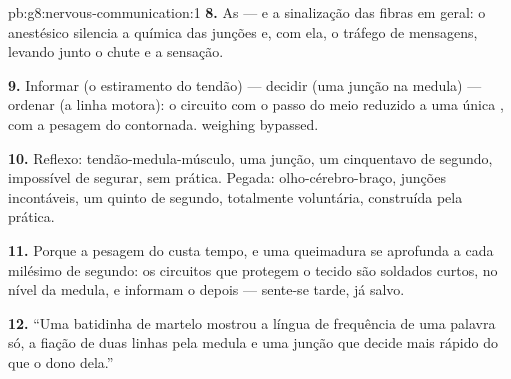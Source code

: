 \begin{solution}{pb:g8:nervous-communication:1}
\textbf{8.} As  --- e a sinalização das fibras em geral: o
anestésico silencia a química das junções e, com ela, o tráfego de
mensagens, levando junto o chute e a sensação.

\textbf{9.} Informar (o estiramento do tendão) --- decidir (uma junção
na medula) --- ordenar (a linha motora): o circuito com o passo do meio
reduzido a uma única , com a pesagem do  contornada.
weighing bypassed.

\textbf{10.} Reflexo: tendão-medula-músculo, uma junção, um
cinquentavo de segundo, impossível de segurar, sem prática. Pegada:
olho-cérebro-braço, junções incontáveis, um quinto de segundo,
totalmente voluntária, construída pela prática.

\textbf{11.} Porque a pesagem do  custa tempo, e uma queimadura
se aprofunda a cada milésimo de segundo: os circuitos que protegem o
tecido são soldados curtos, no nível da medula, e informam o 
depois --- sente-se tarde, já salvo.

\textbf{12.} ``Uma batidinha de martelo mostrou a língua de frequência
de uma palavra só, a fiação de duas linhas pela medula e uma junção
que decide mais rápido do que o dono dela.''
\end{solution}
